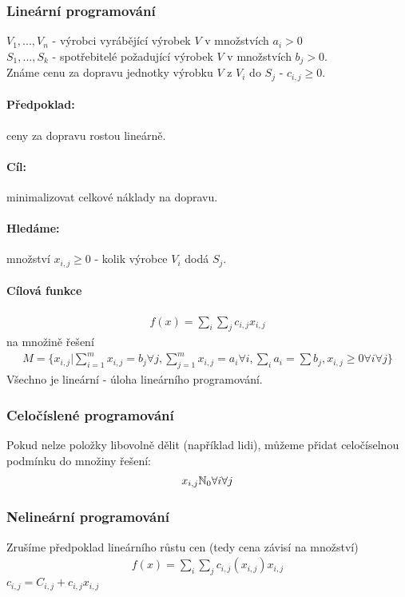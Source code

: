 \documentclass[a4paper,12pt,titlepage]{article}
\begin{document}
\subsubsection{Lineární programování}
$V_1, ..., V_n$ - výrobci vyrábějící výrobek $V$ v množstvích $a_i \gt 0$ \\
$S_1, ..., S_k$ - spotřebitelé požadující výrobek $V$ v množstvích $b_j \gt 0$.\\
Známe cenu za dopravu jednotky výrobku $V$ z $V_i$ do $S_j$ - $c_{i,j} \ge 0$.
\paragraph{Předpoklad:} ceny za dopravu rostou lineárně.
\paragraph{Cíl:} minimalizovat celkové náklady na dopravu.
\paragraph{Hledáme:} množství $x_{i,j} \ge 0$ - kolik výrobce $V_i$ dodá $S_j$.
\paragraph{Cílová funkce}
\begin{align}
	f(x) = \sum_i \sum_j c_{i,j} x_{i,j}
\end{align}
na množině řešení
\begin{align}
	M = \{ x_{i,j} | \sum_{i=1}^m x_{i,j} = b_j \forall j, \sum_{j=1}^m x_{i,j}
	= a_i \forall i, \sum_i a_i = \sum b_j, x_{i,j} \ge 0 \forall i \forall j \}
\end{align}
Všechno je lineární - úloha lineárního programování.
\subsubsection{Celočíslené programování}
Pokud nelze položky libovolně dělit (například lidi), můžeme přidat celočíselnou
podmínku do množiny řešení:
\begin{align}
	x_{i,j} \mathbb{N}_0 \forall i \forall j
\end{align}
\subsubsection{Nelineární programování}
Zrušíme předpoklad lineárního růstu cen (tedy cena závisí na množství)
\begin{align}
	f(x) = \sum_i \sum_j c_{i,j}(x_{i,j}) x_{i,j}
\end{align}
$c_{i,j} = C_{i,j} + c_{i,j} x_{i,j}$
\end{document}
